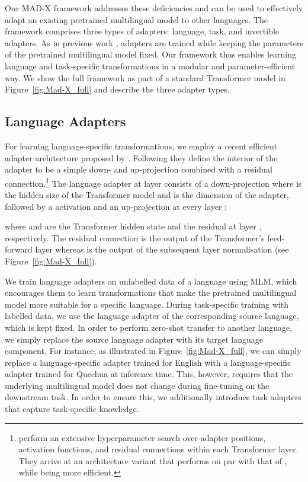 \documentclass[11pt,a4paper]{article}
\newcommand{\model}[1]{\textsc{MAD-X}}
\begin{document}
Our \model{} framework addresses these deficiencies and can be used to effectively adapt an existing pretrained multilingual model to other languages. The framework comprises three types of adapters: language, task, and invertible adapters. As in previous work \cite{Rebuffi2017adapters,Houlsby2019adapters}, adapters are trained while keeping the parameters of the pretrained multilingual model fixed. Our framework thus enables learning language and task-specific transformations in a modular and parameter-efficient way. We show the full framework as part of a standard Transformer model in Figure~\ref{fig:Mad-X_full} and describe the three adapter types.  
\subsection{Language Adapters}
\label{sec:transformer_adapters}

For learning language-specific transformations, we employ a recent efficient adapter architecture proposed by \citet{Pfeiffer2020adapterfusion}. Following \citet{Houlsby2019adapters} they define the interior of the adapter to be a simple down- and up-projection combined with a residual connection.\footnote{\citet{Pfeiffer2020adapterfusion} perform an extensive hyperparameter search over adapter positions, activation functions, and residual connections within each Transformer layer. They arrive at an architecture variant that performs on par with that of \citet{Houlsby2019adapters}, while being more efficient.}  The language adapter  at layer  consists of a down-projection  where  is the hidden size of the Transformer model and  is the dimension of the adapter, followed by a  activation and an up-projection  at every layer :

where  and  are the Transformer hidden state and the residual at layer , respectively. The residual connection  is the output of the Transformer's feed-forward layer whereas  is the output of the subsequent layer normalisation (see Figure~\ref{fig:Mad-X_full}).

We train language adapters on unlabelled data of a language using MLM, which encourages them to learn transformations that make the pretrained multilingual model more suitable for a specific language. During task-specific training with labelled data, we use the language adapter of the corresponding source language, which is kept fixed. In order to perform zero-shot transfer to another language, we simply replace the source language adapter with its target language component. For instance, as illustrated in Figure~\ref{fig:Mad-X_full}, we can simply replace a language-specific adapter trained for English with a language-specific adapter trained for Quechua at inference time. This, however, requires that the underlying multilingual model does not change during fine-tuning on the downstream task. In order to ensure this, we additionally introduce task adapters that capture task-specific knowledge.
\end{document}

